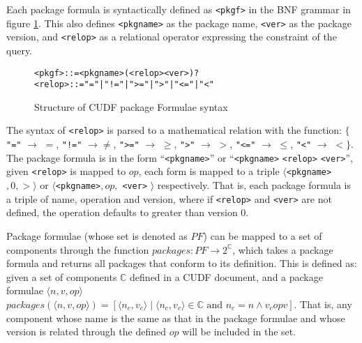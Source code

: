 Each package formula is syntactically defined as \verb+<pkgf>+ in the BNF grammar in figure \ref{formal.cudfpackageformulasyntax}.
This also defines \verb+<pkgname>+ as the package name, \verb+<ver>+ as the package version, and \verb+<relop>+ as a relational operator expressing the constraint of the query.

\begin{figure}[htp] 
\begin{center}
\begin{alltt}
<pkgf> ::= <pkgname> (<relop> <ver>)?
<relop> ::=  "=" | "!=" | ">=" | ">" | "<=" | "<"
\end{alltt}
  \caption[Package Formulae syntax]{Structure of CUDF package Formulae syntax}
  \label{formal.cudfpackageformulasyntax}
\end{center}
\end{figure}

The syntax of \verb+<relop>+ is parsed to a mathematical relation with the function:  
$\{$ \verb+"="+ $\rightarrow$ $=$, \verb+"!="+ $\rightarrow \not =$, \verb+">="+ $\rightarrow$ $\geq$, \verb+">"+ $\rightarrow$ $>$, \verb+"<="+ $\rightarrow$ $\leq$, \verb+"<"+ $\rightarrow$ $<$$\}$.
The package formula is in the form ``\verb+<pkgname>+'' or  ``\verb+<pkgname>+ \verb+<relop>+ \verb+<ver>+'',
given \verb+<relop>+ is mapped to $op$, each form is mapped to a triple $\langle $\verb+<pkgname>+$,0,>\rangle$ or $\langle$\verb+<pkgname>+$,op,$ \verb+<ver>+ $\rangle$ respectively.
That is, each package formula is a triple of name, operation and version, 
where if \verb+<relop>+ and \verb+<ver>+ are not defined, the operation defaults to greater than version 0.

Package formulae (whose set is denoted as $PF$) can be mapped to a set of components through the function $packages: PF \rightarrow 2^{\mathbb{C}}$,
which takes a package formula and returns all packages that conform to its definition.
This is defined as:
given a set of components $\mathbb{C}$ defined in a CUDF document, and a package formulae $\langle n,v,op\rangle$
$packages(\langle n,v,op\rangle) = [\langle n_c,v_c \rangle \mid \langle n_c,v_c \rangle \in \mathbb{C} \mbox{ and } n_c = n \wedge v_c op v]$.
That is, any component whose name is the same as that in the package formulae and whose version is related through the defined $op$ will be included in the set.

